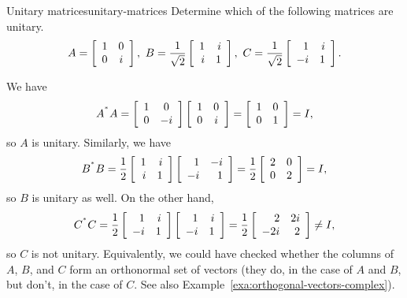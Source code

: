 \documentclass{ximera}
\begin{document}
\begin{example}{Unitary matrices}{unitary-matrices}
  Determine which of the following matrices are unitary.
  \begin{equation*}
    A = \startmat{cc}
      1 & 0 \\
      0 & i \\
    \stopmat,
    \quad
    B = \frac{1}{\sqrt{2}}
    \startmat{rr}
      1 & i \\
      i & 1 \\
    \stopmat,
    \quad
    C = \frac{1}{\sqrt{2}}
    \startmat{rr}
      1 & i \\
      -i & 1 \\
    \stopmat.
  \end{equation*}
\end{example}

\begin{solution}
  We have
  \begin{equation*}
    A^{\adjoint}A =
    \startmat{cc}
      1 & 0 \\
      0 & -i \\
    \stopmat\startmat{cc}
      1 & 0 \\
      0 & i \\
    \stopmat
    = \startmat{cc}
      1 & 0 \\
      0 & 1 \\
    \stopmat
    = I,
  \end{equation*}
  so $A$ is unitary. Similarly, we have
  \begin{equation*}
    B^{\adjoint}B =
    \frac{1}{2}
    \startmat{rr}
      1 & i \\
      i & 1 \\
    \stopmat\startmat{rr}
      1 & -i \\
      -i & 1 \\
    \stopmat
    = \frac{1}{2}
    \startmat{rr}
      2 & 0 \\
      0 & 2 \\
    \stopmat
    = I,
  \end{equation*}
  so $B$ is unitary as well. On the other hand,
  \begin{equation*}
    C^{\adjoint}C =
    \frac{1}{2}
    \startmat{rr}
      1 & i \\
      -i & 1 \\
    \stopmat\startmat{rr}
      1 & i \\
      -i & 1 \\
    \stopmat
    = \frac{1}{2}
    \startmat{rr}
      2 & 2i \\
      -2i & 2 \\
    \stopmat
    \neq I,
  \end{equation*}
  so $C$ is not unitary. Equivalently, we could have checked whether
  the columns of $A$, $B$, and $C$ form an orthonormal set of vectors
  (they do, in the case of $A$ and $B$, but don't, in the case of
  $C$. See also Example~\ref{exa:orthogonal-vectors-complex}).
\end{solution}
\end{document}
